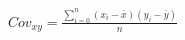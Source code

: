 \documentclass[10pt]{article}
\begin{document}
\begin{align*}Cov_{xy} = \frac{\sum\limits_{i=0}^n (x_i - \bar{x})(y_i - \bar{y})}{n}\end{align*}
\end{document}
